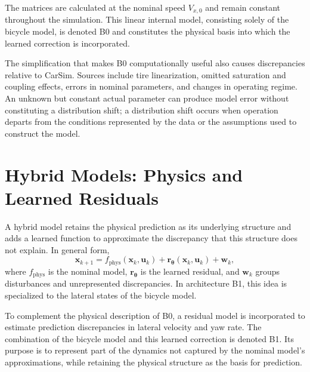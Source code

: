 \documentclass[12pt,a4paper]{report}
\begin{document}
The matrices are calculated at the nominal speed $V_{x,0}$ and remain constant throughout the simulation. This linear internal model, consisting solely of the bicycle model, is denoted B0 and constitutes the physical basis into which the learned correction is incorporated.

The simplification that makes B0 computationally useful also causes discrepancies relative to CarSim. Sources include tire linearization, omitted saturation and coupling effects, errors in nominal parameters, and changes in operating regime. An unknown but constant actual parameter can produce model error without constituting a distribution shift; a distribution shift occurs when operation departs from the conditions represented by the data or the assumptions used to construct the model.

\section{Hybrid Models: Physics and Learned Residuals}
\label{sec:modelos_hibridos_residuales}

A hybrid model retains the physical prediction as its underlying structure and adds a learned function to approximate the discrepancy that this structure does not explain. In general form,
\begin{equation}
    \mathbf{x}_{k+1}
    =
    f_{\mathrm{phys}}(\mathbf{x}_k,\mathbf{u}_k)
    +
    \mathbf{r}_{\boldsymbol{\theta}}(\mathbf{x}_k,\mathbf{u}_k)
    +
    \mathbf{w}_k,
    \label{eq:generic_hybrid_model}
\end{equation}
where $f_{\mathrm{phys}}$ is the nominal model, $\mathbf{r}_{\boldsymbol{\theta}}$ is the learned residual, and $\mathbf{w}_k$ groups disturbances and unrepresented discrepancies. In architecture B1, this idea is specialized to the lateral states of the bicycle model.

To complement the physical description of B0, a residual model is incorporated to estimate prediction discrepancies in lateral velocity and yaw rate. The combination of the bicycle model and this learned correction is denoted B1. Its purpose is to represent part of the dynamics not captured by the nominal model's approximations, while retaining the physical structure as the basis for prediction.
\end{document}
